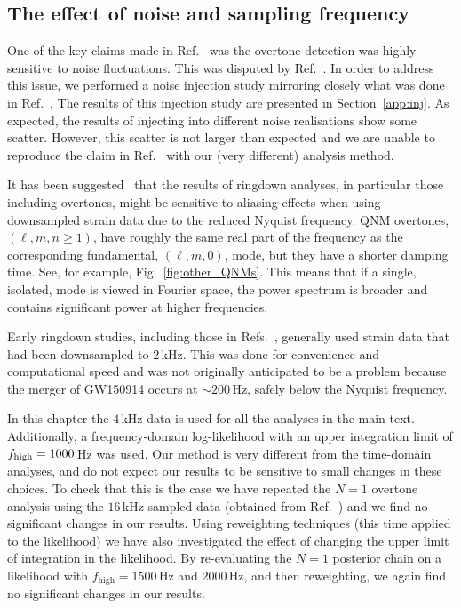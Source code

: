 \subsection{The effect of noise and sampling frequency}\label{subsec:noise}

One of the key claims made in Ref.~\cite{Cotesta:2022pci} was the overtone detection was highly sensitive to noise fluctuations.
This was disputed by Ref.~\cite{Isi:2022mhy}.
In order to address this issue, we performed a noise injection study mirroring closely what was done in Ref.~\cite{Cotesta:2022pci}.
The results of this injection study are presented in Section~\ref{app:inj}.
As expected, the results of injecting into different noise realisations show some scatter.
However, this scatter is not larger than expected and we are unable to reproduce the claim in Ref.~\cite{Cotesta:2022pci} with our (very different) analysis method. 

It has been suggested~\cite{WillMaxTGRtelecon} that the results of ringdown analyses, in particular those including overtones, might be sensitive to aliasing effects when using downsampled strain data due to the reduced Nyquist frequency.
QNM overtones, $(\ell, m, n \geq 1)$, have roughly the same real part of the frequency as the corresponding fundamental, $(\ell, m, 0)$, mode, but they have a shorter damping time. 
See, for example, Fig.~\ref{fig:other_QNMs}. 
This means that if a single, isolated, mode is viewed in Fourier space, the power spectrum is broader and contains significant power at higher frequencies.

Early ringdown studies, including those in Refs.~\cite{LIGOScientific:2016lio, Isi:2019aib, Isi:2022mhy}, generally used strain data that had been downsampled to $2\,$kHz. 
This was done for convenience and computational speed and was not originally anticipated to be a problem because the merger of GW150914 occurs at $\sim 200\,\mathrm{Hz}$, safely below the Nyquist frequency.

In this chapter the $4\,$kHz data is used for all the analyses in the main text. 
Additionally, a frequency-domain log-likelihood with an upper integration limit of $f_{\rm high}=1000\,$Hz was used.
Our method is very different from the time-domain analyses, and do not expect our results to be sensitive to small changes in these choices.
To check that this is the case we have repeated the $N=1$ overtone analysis using the $16\,$kHz sampled data (obtained from Ref.~\cite{gwosc}) and we find no significant changes in our results.
Using reweighting techniques (this time applied to the likelihood) we have also investigated the effect of changing the upper limit of integration in the likelihood. 
By re-evaluating the $N=1$ posterior chain on a likelihood with $f_\mathrm{high}=1500\,$Hz and $2000\,$Hz, and then reweighting, we again find no significant changes in our results.



